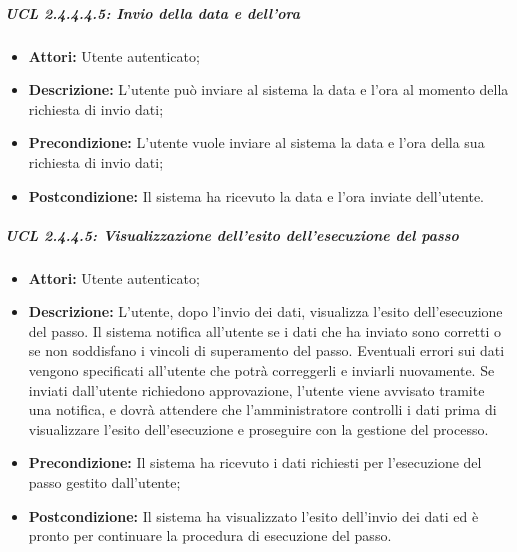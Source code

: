 \subparagraph{UCL 2.4.4.4.5: Invio della data e dell'ora}
\begin{itemize}
\item \textbf{Attori:} Utente autenticato;
\item \textbf{Descrizione:} L'utente può inviare al sistema la data e l'ora al momento della richiesta di invio dati;
\item \textbf{Precondizione:} L'utente vuole inviare al sistema la data e l'ora della sua richiesta di invio dati;
\item \textbf{Postcondizione:} Il sistema ha ricevuto la data e l'ora inviate dell'utente.
\end{itemize}

\subparagraph{UCL 2.4.4.5: Visualizzazione dell'esito dell'esecuzione del passo}
\begin{itemize}
\item \textbf{Attori:} Utente autenticato;
\item \textbf{Descrizione:} L'utente, dopo l'invio dei dati, visualizza l'esito dell'esecuzione del passo. Il sistema notifica all'utente se i dati che ha inviato sono corretti o se non soddisfano i vincoli di superamento del passo.
Eventuali errori sui dati vengono specificati all'utente che potrà correggerli e inviarli nuovamente.
Se inviati dall'utente richiedono approvazione, l'utente viene avvisato tramite una notifica, e dovrà attendere che l'amministratore controlli i dati prima di visualizzare l'esito dell'esecuzione e proseguire con la gestione del processo.
\item \textbf{Precondizione:} Il sistema ha ricevuto i dati richiesti per l'esecuzione del passo gestito dall'utente;
\item \textbf{Postcondizione:} Il sistema ha visualizzato l'esito dell'invio dei dati ed è pronto per continuare la procedura di esecuzione del passo.
\end{itemize}

